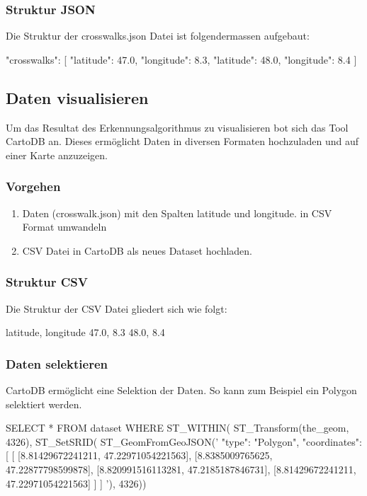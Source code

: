 \subsubsection{Struktur JSON}
Die Struktur der crosswalks.json Datei ist folgendermassen aufgebaut:
\medskip
\begin{python}
{
	"crosswalks": 
	[
		{"latitude": 47.0, "longitude": 8.3},
		{"latitude": 48.0, "longitude": 8.4}
	]
}
\end{python}

\newpage

\subsection{Daten visualisieren}
Um das Resultat des Erkennungsalgorithmus zu visualisieren bot sich das Tool CartoDB \cite{CartoDB} an. Dieses ermöglicht Daten in diversen Formaten hochzuladen und auf einer Karte anzuzeigen.

\subsubsection{Vorgehen}
\begin{enumerate}
	\item Daten (crosswalk.json) mit den Spalten latitude und longitude. in CSV Format umwandeln
	\item CSV Datei in CartoDB als neues Dataset hochladen.
\end{enumerate}

\subsubsection{Struktur CSV}
Die Struktur der CSV Datei gliedert sich wie folgt:
\medskip
\begin{python}
	latitude,	longitude
	47.0,		8.3
	48.0,		8.4
\end{python}


\subsubsection{Daten selektieren}
CartoDB ermöglicht eine Selektion der Daten. So kann zum Beispiel ein Polygon selektiert werden.
\medskip
\begin{python}
SELECT * FROM dataset WHERE ST_WITHIN(
 	ST_Transform(the_geom, 4326), ST_SetSRID(
 	ST_GeomFromGeoJSON('{ "type": "Polygon",
        "coordinates": [
          [ [8.81429672241211,
             47.22971054221563],
            [8.8385009765625,
             47.22877798599878],
            [8.820991516113281,
             47.2185187846731],
            [8.81429672241211,
             47.22971054221563]
          ]
        ] }'), 
   4326)) 
\end{python}
\newpage

